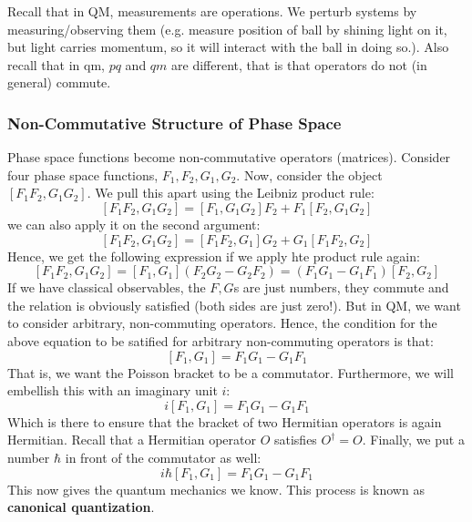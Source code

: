 \documentclass[../PHYS306Notes.tex]{subfiles}
\begin{document}
\noindent Recall that in QM, measurements are operations. We perturb systems by measuring/observing them (e.g. measure position of ball by shining light on it, but light carries momentum, so it will interact with the ball in doing so.). Also recall that in qm, $pq$ and $qm$ are different, that is that operators do not (in general) commute. 

\subsubsection{Non-Commutative Structure of Phase Space}
Phase space functions become non-commutative operators (matrices).
\noindent Consider four phase space functions, $F_1, F_2, G_1, G_2$. Now, consider the object $[F_1F_2, G_1G_2]$. We pull this apart using the Leibniz product rule:
\[[F_1F_2, G_1G_2] = [F_1, G_1G_2]F_2 + F_1[F_2, G_1G_2] \]
we can also apply it on the second argument:
\[[F_1F_2, G_1G_2] = [F_1F_2, G_1]G_2 + G_1[F_1F_2, G_2]\]
Hence, we get the following expression if we apply hte product rule again:
\[[F_1F_2, G_1G_2] = [F_1, G_1](F_2G_2 - G_2F_2) = (F_1G_1 - G_1F_1)[F_2, G_2]\]
If we have classical observables, the $F, G$s are just numbers, they commute and the relation is obviously satisfied (both sides are just zero!). But in QM, we want to consider arbitrary, non-commuting operators. Hence, the condition for the above equation to be satified for arbitrary non-commuting operators is that:
\[[F_1, G_1] = F_1G_1 - G_1F_1\]
That is, we want the Poisson bracket to be a commutator. Furthermore, we will embellish this with an imaginary unit $i$:
\[i[F_1, G_1] = F_1G_1 - G_1F_1\]
Which is there to ensure that the bracket of two Hermitian operators is again Hermitian. Recall that a Hermitian operator $O$ satisfies $O^\dagger = O$. Finally, we put a number $\hbar$ in front of the commutator as well:
\[i\hbar[F_1, G_1] = F_1G_1 - G_1F_1\]
This now gives the quantum mechanics we know. This process is known as \textbf{canonical quantization}.
\end{document}
